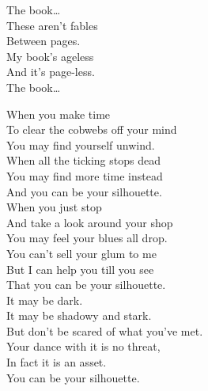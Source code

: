 The book… \\

These aren't fables \\
Between pages. \\
My book's ageless \\
And it's page-less. \\

The book… \\













When you make time \\
To clear the cobwebs off your mind \\
You may find yourself unwind. \\
When all the ticking stops dead \\
You may find more time instead \\
And you can be your silhouette. \\

When you just stop \\
And take a look around your shop \\
You may feel your blues all drop. \\
You can't sell your glum to me \\
But I can help you till you see \\
That you can be your silhouette. \\

It may be dark. \\
It may be shadowy and stark. \\
But don't be scared of what you've met. \\
Your dance with it is no threat, \\
In fact it is an asset. \\
You can be your silhouette. \\




